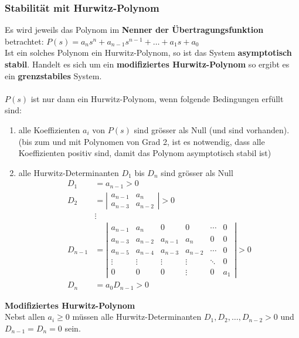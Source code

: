 \subsubsection{Stabilität mit Hurwitz-Polynom }
Es wird jeweils das Polynom im \textbf{Nenner der Übertragungsfunktion} betrachtet:
$P(s) = a_n s^n + a_{n-1} s^{n-1} +\ldots +a_1s + a_0$ \\
Ist ein solches Polynom ein Hurwitz-Polynom, so ist das System \textbf{asymptotisch stabil}.
Handelt es sich um ein \textbf{modifiziertes Hurwitz-Polynom} so ergibt es ein
\textbf{grenzstabiles} System.\\ \\
$P(s)$ ist nur dann ein Hurwitz-Polynom, wenn folgende Bedingungen erfüllt sind:
\begin{enumerate}
	\item	alle Koeffizienten $a_i$ von $P(s)$ sind grösser als Null (und sind vorhanden).\\
				(bis zum und mit Polynomen von Grad 2, ist es notwendig, dass alle Koeffizienten positiv
				sind, damit das Polynom asymptotisch stabil ist)
	\item	alle Hurwitz-Determinanten $D_1$ bis $D_n$ sind grösser als Null\\
				\begin{align}
					D_1 &= a_{n-1} > 0 \nonumber\\
					D_2 &= \left|
						\begin{matrix}
							a_{n-1} & a_n\\
							a_{n-3} & a_{n-2}
						\end{matrix}\right| > 0 \nonumber \\
						&\vdots \nonumber \\
					D_{n-1} &= \left|
						\begin{matrix}
							a_{n-1} & a_n & 0 & 0 & \cdots & 0 \\
							a_{n-3} & a_{n-2} & a_{n-1} & a_n & 0 & 0 \\
							a_{n-5} & a_{n-4} & a_{n-3} & a_{n-2} & \cdots & 0 \\
							\vdots & \vdots & \vdots & \vdots & \ddots & 0 \\
							0 & 0 & 0 & \vdots & 0 & a_1
						\end{matrix}\right| > 0 \nonumber \\
					D_n &= a_0D_{n-1} > 0 \nonumber
				\end{align}
\end{enumerate}

\textbf{Modifiziertes Hurwitz-Polynom}\\
Nebst allen $a_i \geq 0$ müssen alle Hurwitz-Determinanten $D_1, D_2, \ldots, D_{n-2} > 0$
und $D_{n-1} = D_n = 0$ sein. \\ \\


